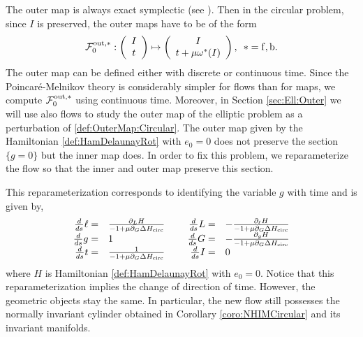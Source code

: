 The outer map is always exact symplectic (see \cite{DelshamsLS08}).
Then in the circular problem, since $I$ is preserved, the outer maps have to be of the form
\begin{equation}\label{def:OuterMap:Circular}
  \mathcal{F}_0^{\mathrm{out},\ast}:\left(\begin{array}{c} I\\
      t
    \end{array}\right)\mapsto \left(\begin{array}{c} I\\
      t+\mu\omega^\ast(I)
    \end{array}\right),\,\,\,\ast=\mathrm{f},\mathrm{b}.
\end{equation}
The outer map can be defined either with discrete or continuous time. Since the Poincar{\'e}-Melnikov
theory is considerably simpler for flows than for maps, we compute $\mathcal{F}^{\mathrm{out},\ast}_0$ using continuous time.
Moreover, in Section \ref{sec:Ell:Outer} we will use also flows to study
the outer map of the elliptic problem as a perturbation of \eqref{def:OuterMap:Circular}.
The outer map  given by the Hamiltonian  \eqref{def:HamDelaunayRot} with $e_0=0$ does
not preserve the section $\{g=0\}$ but the inner map does. In order to fix this problem,
we reparameterize the flow so that the inner and outer map preserve this section.


This reparameterization corresponds to identifying the variable $g$ with
time and is given by,
\begin{equation}\label{def:Reduced:ODE:Circ}
  \begin{array}{rlcrl}
    \frac{d}{ds} \ell=&\frac{\partial_L H}{-1+\mu\partial_G\Delta
      H_{\mathrm{circ}}}&\text{   }&\frac{d}{ds} L=&-\frac{\partial_\ell
      H}{-1+\mu\partial_G\Delta H_{\mathrm{circ}}}\\
    \frac{d}{ds} g=&1&\text{   }&\frac{d}{ds} G=&-\frac{\partial_g
      H}{-1+\mu\partial_G\Delta H_{\mathrm{circ}}}\\
    \frac{d}{ds} t=&\frac{1}{-1+\mu\partial_G\Delta H_{\mathrm{circ}}}&\text{
    }&\frac{d}{ds} I=&0
  \end{array}
\end{equation}
where $H$ is Hamiltonian \eqref{def:HamDelaunayRot} with $e_0=0$.
Notice that this reparameterization implies the change of direction of
time.  However, the geometric objects stay the same. In particular,
the new flow still possesses the normally invariant cylinder obtained
in Corollary \ref{coro:NHIMCircular} and its invariant manifolds.

